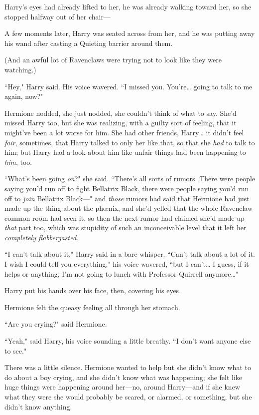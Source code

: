 Harry's eyes had already lifted to her, he was already walking toward her, so she stopped halfway out of her chair---

A few moments later, Harry was seated across from her, and he was putting away his wand after casting a Quieting barrier around them.

(And an awful lot of Ravenclaws were trying not to look like they were watching.)

``Hey," Harry said. His voice wavered. ``I missed you. You're{\ldots} going to talk to me again, now?"

Hermione nodded, she just nodded, she couldn't think of what to say. She'd missed Harry too, but she was realizing, with a guilty sort of feeling, that it might've been a lot worse for him. She had other friends, Harry{\ldots} it didn't feel \emph{fair}, sometimes, that Harry talked to only her like that, so that she \emph{had} to talk to him; but Harry had a look about him like unfair things had been happening to \emph{him}, too.

``What's been going \emph{on}?" she said. ``There's all sorts of rumors. There were people saying you'd run off to fight Bellatrix Black, there were people saying you'd run off to \emph{join} Bellatrix Black---" and \emph{those} rumors had said that Hermione had just made up the thing about the phœnix, and she'd yelled that the whole Ravenclaw common room had seen it, so then the next rumor had claimed she'd made up \emph{that} part too, which was stupidity of such an inconceivable level that it left her \emph{completely flabbergasted}.

``I can't talk about it," Harry said in a bare whisper. ``Can't talk about a lot of it. I wish I could tell you everything," his voice wavered, ``but I can't{\ldots} I guess, if it helps or anything, I'm not going to lunch with Professor Quirrell anymore{\ldots}"

Harry put his hands over his face, then, covering his eyes.

Hermione felt the queasy feeling all through her stomach.

``Are you crying?" said Hermione.

``Yeah," said Harry, his voice sounding a little breathy. ``I don't want anyone else to see."

There was a little silence. Hermione wanted to help but she didn't know what to do about a boy crying, and she didn't know what was happening; she felt like huge things were happening around her---no, around Harry---and if she knew what they were she would probably be scared, or alarmed, or something, but she didn't know anything.

